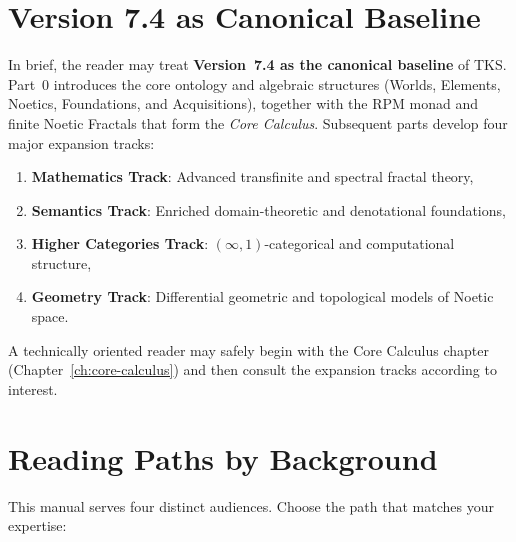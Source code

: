 \documentclass[11pt,twoside,openright]{book}
\theoremstyle{definition}
\theoremstyle{plain}
\theoremstyle{remark}
\begin{document}
\section*{Version 7.4 as Canonical Baseline}

In brief, the reader may treat \textbf{Version~7.4 as the canonical baseline} of TKS. Part~0 introduces the core ontology and algebraic structures (Worlds, Elements, Noetics, Foundations, and Acquisitions), together with the RPM monad and finite Noetic Fractals that form the \emph{Core Calculus}. Subsequent parts develop four major expansion tracks:
\begin{enumerate}[nosep]
    \item \textbf{Mathematics Track}: Advanced transfinite and spectral fractal theory,
    \item \textbf{Semantics Track}: Enriched domain-theoretic and denotational foundations,
    \item \textbf{Higher Categories Track}: $(\infty,1)$-categorical and computational structure,
    \item \textbf{Geometry Track}: Differential geometric and topological models of Noetic space.
\end{enumerate}
A technically oriented reader may safely begin with the Core Calculus chapter (Chapter~\ref{ch:core-calculus}) and then consult the expansion tracks according to interest.

\section*{Reading Paths by Background}

This manual serves four distinct audiences. Choose the path that matches your expertise:
\end{document}
